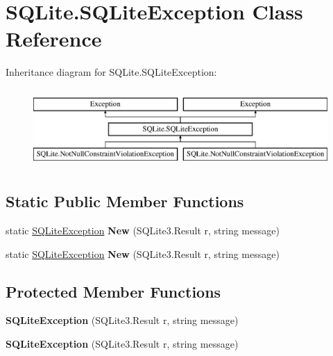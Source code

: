 \hypertarget{classSQLite_1_1SQLiteException}{\section{S\-Q\-Lite.\-S\-Q\-Lite\-Exception Class Reference}
\label{classSQLite_1_1SQLiteException}
}
Inheritance diagram for S\-Q\-Lite.\-S\-Q\-Lite\-Exception\-:\begin{figure}[H]
\begin{center}
\leavevmode
\includegraphics[height=3.000000cm]{classSQLite_1_1SQLiteException}
\end{center}
\end{figure}
\subsection*{Static Public Member Functions}
\begin{DoxyCompactItemize}
\item 
\hypertarget{classSQLite_1_1SQLiteException_ac74e9093fc476760b090efb43d226a97}{static \hyperlink{classSQLite_1_1SQLiteException}{S\-Q\-Lite\-Exception} {\bfseries New} (S\-Q\-Lite3.\-Result r, string message)}\label{classSQLite_1_1SQLiteException_ac74e9093fc476760b090efb43d226a97}

\item 
\hypertarget{classSQLite_1_1SQLiteException_ac74e9093fc476760b090efb43d226a97}{static \hyperlink{classSQLite_1_1SQLiteException}{S\-Q\-Lite\-Exception} {\bfseries New} (S\-Q\-Lite3.\-Result r, string message)}\label{classSQLite_1_1SQLiteException_ac74e9093fc476760b090efb43d226a97}

\end{DoxyCompactItemize}
\subsection*{Protected Member Functions}
\begin{DoxyCompactItemize}
\item 
\hypertarget{classSQLite_1_1SQLiteException_a360138124608a44ec47ab94e6bb988f8}{{\bfseries S\-Q\-Lite\-Exception} (S\-Q\-Lite3.\-Result r, string message)}\label{classSQLite_1_1SQLiteException_a360138124608a44ec47ab94e6bb988f8}

\item 
\hypertarget{classSQLite_1_1SQLiteException_a360138124608a44ec47ab94e6bb988f8}{{\bfseries S\-Q\-Lite\-Exception} (S\-Q\-Lite3.\-Result r, string message)}\label{classSQLite_1_1SQLiteException_a360138124608a44ec47ab94e6bb988f8}

\end{DoxyCompactItemize}
